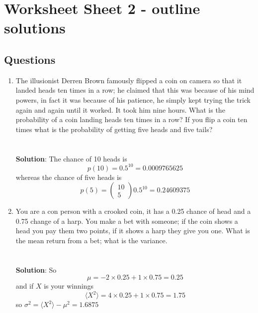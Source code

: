 \documentclass[11pt,a4paper]{scrartcl}
\begin{document}
\section*{Worksheet Sheet 2 - outline solutions}

\subsection*{Questions}

\begin{enumerate}


\item The illusionist Derren Brown famously flipped a coin on camera
  so that it landed heads ten times in a row; he claimed that this was
  because of his mind powers, in fact it was because of his patience,
  he simply kept trying the trick again and again until it
  worked. It took him nine hours. What is the probability of a coin landing heads ten times in
  a row? If you flip a coin ten times what is the probability of
  getting five heads and five tails?\\ \\ \\ \textbf{Solution}: The chance of 10 heads is
\begin{equation}
p(10)=0.5^{10}=0.0009765625
\end{equation}
whereas the chance of five heads is
\begin{equation}
p(5)=\left(\begin{array}{c}10\\5\end{array}\right)0.5^{10}=0.24609375
\end{equation}


\item You are a con person with a crooked coin, it has a 0.25 chance
  of head and a 0.75 change of a harp. You make a bet with someone; if
  the coin shows a head you pay them two points, if it shows a harp
  they give you one. What is the mean return from a bet; what is the variance.
\\ \\ \\
\textbf{Solution}: So 
\begin{equation}
\mu =-2\times 0.25 +1\times 0.75=0.25
\end{equation}
and if $X$ is your winnings
\begin{equation}
  \langle X^2\rangle=4\times 0.25 +1\times 0.75=1.75
\end{equation}
so $\sigma^2=\langle X^2\rangle-\mu^2=1.6875$
  

\end{enumerate}
\end{document}
